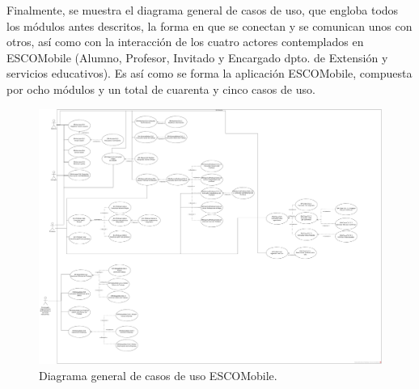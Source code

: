 \noindent
Finalmente, se muestra el diagrama general de casos de uso, que engloba todos los módulos antes descritos,
la forma en que se conectan y se comunican unos con otros, así como con la interacción de los cuatro actores 
contemplados en ESCOMobile (Alumno, Profesor, Invitado y Encargado dpto. de Extensión y servicios educativos).
Es así como se forma la aplicación ESCOMobile, compuesta por ocho módulos y un total de cuarenta y cinco
casos de uso. 

\pagebreak
\begin{figure}[htbp!]
	\centering
	\includegraphics[width=1\textwidth]{images/casos/general}
	\caption{Diagrama general de casos de uso ESCOMobile.}
\end{figure}